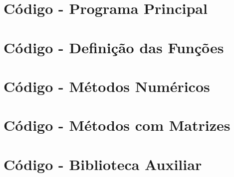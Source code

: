 \documentclass{homework}
\begin{document}
	
	

	\pagebreak
	\appendixpage
	\appendix \section*{Código - Programa Principal}
	
	\appendix \section*{Código - Definição das Funções}
	
	\appendix \section*{Código - Métodos Numéricos}
	
	\appendix \section*{Código - Métodos com Matrizes}
	
	\appendix \section*{Código - Biblioteca Auxiliar}
	
%		
\end{document}
